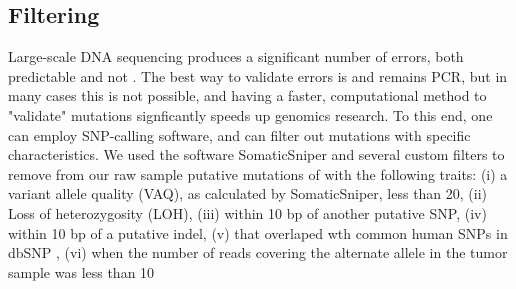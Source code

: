 \documentclass[11pt]{article} %
\begin{document}
\subsection{Filtering}

Large-scale DNA sequencing produces a significant number of errors, both predictable and not \cite{sequence_error}. The best way to validate errors is and remains PCR, but in many cases this is not possible, and having a faster, computational method to "validate" mutations signficantly speeds up genomics research. To this end, one can employ SNP-calling software, and can filter out mutations with specific characteristics. We used the software SomaticSniper \cite{SomaticSniper} and several custom filters to remove from our raw sample putative mutations of with the following traits: (i) a variant allele quality (VAQ), as calculated by SomaticSniper, less than 20, (ii) Loss of heterozygosity (LOH), (iii) within 10 bp of another putative SNP, (iv) within 10 bp of a putative indel, (v) that overlaped wth common human SNPs in dbSNP \cite{dbSNP}, (vi) when the number of reads covering the alternate allele in the tumor sample was less than 10%
\end{document}
